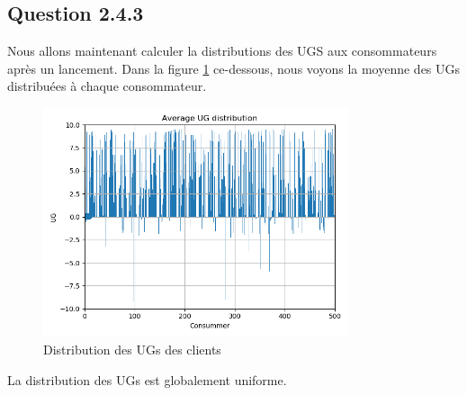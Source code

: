 \subsection{Question 2.4.3}
Nous allons maintenant calculer la distributions des UGS aux consommateurs après un lancement. Dans la figure \ref{fig:distribution} ce-dessous, nous voyons la moyenne des UGs distribuées à chaque consommateur.
\begin{figure}[H]
    \centering
    \includegraphics[width=0.8\textwidth]{images/Distribution.png}
    \caption{Distribution des UGs des clients}
    \label{fig:distribution}
\end{figure}
La distribution des UGs est globalement uniforme.

